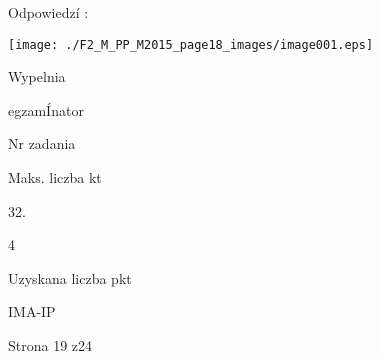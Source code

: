 \documentclass[a4paper,12pt]{article}
\begin{document}
Odpowiedzí :
\begin{center}
\texttt{[image: ./F2\_M\_PP\_M2015\_page18\_images/image001.eps]}
\end{center}
Wypelnia

egzamÍnator

Nr zadania

Maks. liczba kt

32.

4

Uzyskana liczba pkt

IMA-IP

Strona 19 z24
\end{document}

